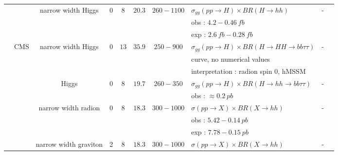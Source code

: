 \begin{table}[h!]
{\begin{tabular}{|l|l|c|c|c|c|c|l|c|c|}
\cline{3-10}
                    &        &narrow width Higgs        &0    &$8$        &$20.3$        &$260-1100$        &$\sigma_{gg}(pp\rightarrow H)\times BR(H\rightarrow hh)$                 &-    &\cite{Aad:2015xja}\\
                    &        &                &    &        &        &            &obs : $4.2-0.46\ fb$                                &    &\\
                    &        &                &    &        &        &            &exp : $2.6\ fb-0.28\ fb$                                &    &\\
\cline{2-10}
                    &CMS        &narrow width Higgs        &0    &$13$        &$35.9$        &$250-900$        &$\sigma_{gg}(pp\rightarrow H)\times BR(H\rightarrow HH\rightarrow bb\tau\tau)$     &-    &\cite{Sirunyan:2017djm}\\
                    &        &                &    &        &        &            &curve, no numerical values                                &    &\\
                    &        &                &    &        &        &            &interpretation : radion spin 0, hMSSM                            &    &\\
\cline{3-10}
                    &        &Higgs                &0    &$8$        &$19.7$        &$260-350$        &$\sigma_{gg}(pp\rightarrow H)\times BR(H\rightarrow hh\rightarrow bb\tau\tau)$     &-    &\cite{Khachatryan:2015tha}\\
                    &        &                &    &        &        &            &obs : $\approx 0.2\ pb$                                &    &\\
\cline{3-10}
                    &        &narrow width radion        &0    &$8$        &$18.3$        &$300-1000$        &$\sigma(pp\rightarrow X)\times BR(X\rightarrow hh)$                     &-    &\cite{Sirunyan:2017tqo}\\
                    &        &                &    &        &        &            &obs : $5.42-0.14\ pb$                                    &    &\\
                    &        &                &    &        &        &            &exp : $7.78-0.15\ pb$                                    &    &\\
\cline{3-10}
                    &        &narrow width graviton        &2    &$8$        &$18.3$        &$300-1000$        &$\sigma(pp\rightarrow X)\times BR(X\rightarrow hh)$                     &-    &\cite{Sirunyan:2017tqo}\\

\end{tabular}}
\end{table}

